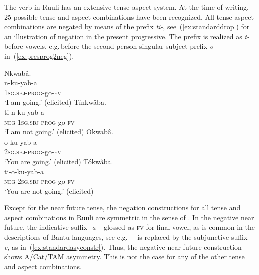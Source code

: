 \documentclass[output=paper,colorlinks,citecolor=brown,draftmode]{langscibook}
\begin{document}
The verb in Ruuli has an extensive tense-aspect system. 
At the time of writing, 25 possible tense and aspect combinations have been recognized. 
All tense-aspect combinations are negated by means of the prefix \textit{ti-}, see~(\ref{ex:standarddrop}) for an illustration of negation in the present progressive. 
The prefix is realized as \textit{t-} before vowels, e.g.\,before the second person singular subject prefix \textit{o-} in~(\ref{ex:presprog2neg}).

\ea\label{ex:standarddrop}\label{ex:ruulietal:2}
\begin{xlist}
\ex  \label{ex:presprog1}
	\glll Nkwabâ.\\
	    n-ku-yab-a\\
		1\textsc{sg.sbj}-\textsc{prog}-go-\textsc{fv}\\
	\glt ‘I am going.’  (elicited)
\ex \label{ex:presprog1neg}
	\glll  Tínkwâba.\\
	        ti-n-ku-yab-a\\
		    \textsc{neg}-1\textsc{sg.sbj}-\textsc{prog}-go-\textsc{fv}\\
	\glt    ‘I am not going.’ 	 (elicited)
\ex \label{ex:presprog2}
	\glll   Okwabâ.\\
	        o-ku-yab-a\\
		    \textsc{2sg.sbj}-\textsc{prog}-go-\textsc{fv} \\
	\glt    `You are going.’  (elicited)
\ex \label{ex:presprog2neg}
	\glll   Tókwâba.\\
	        ti-o-ku-yab-a\\
		    \textsc{neg}-\textsc{2sg.sbj}-\textsc{prog}-go-\textsc{fv} \\
	\glt    ‘You are not going.' (elicited)
\end{xlist}
\z

Except for the near future tense, the negation constructions for all tense and aspect combinations in Ruuli are symmetric in the sense of \citet{Miestamo2005, Miestamo2017}. 
In the negative near future, the indicative suffix \textit{-a} – glossed as \textsc{fv} for final vowel, as is common in the descriptions of Bantu languages, see e.g.\,\citet[44]{Nurse2008} – is replaced by the subjunctive suffix \textit{-e}, as in~(\ref{ex:standardasyconstr}).
Thus, the negative near future construction shows A/Cat/TAM asymmetry. 
This is not the case for any of the other tense and aspect combinations. 
\end{document}
